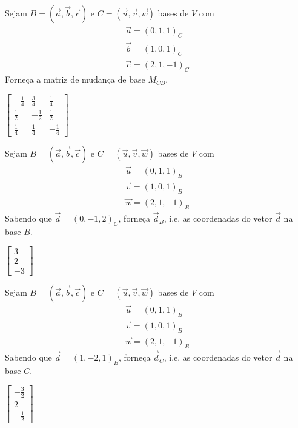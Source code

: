 \begin{exer}
  Sejam $B=(\vec{a},\vec{b},\vec{c})$ e $C=(\vec{u},\vec{v},\vec{w})$ bases de $V$ com
  \begin{gather}
    \vec{a} = (0,1,1)_C\\
    \vec{b} = (1,0,1)_C\\
    \vec{c} = (2,1,-1)_C
  \end{gather}
  Forneça a matriz de mudança de base $M_{CB}$.
\end{exer}
\begin{resp}
  $\displaystyle
  \begin{bmatrix}
    - \frac{1}{4} & \frac{3}{4} & \frac{1}{4}\\
    \frac{1}{2} & - \frac{1}{2} & \frac{1}{2}\\
    \frac{1}{4} & \frac{1}{4} & - \frac{1}{4}
  \end{bmatrix}
$
\end{resp}

\begin{exer}
  Sejam $B=(\vec{a},\vec{b},\vec{c})$ e $C=(\vec{u},\vec{v},\vec{w})$ bases de $V$ com
  \begin{gather}
    \vec{u} = (0,1,1)_B\\
    \vec{v} = (1,0,1)_B\\
    \vec{w} = (2,1,-1)_B
  \end{gather}
  Sabendo que $\vec{d}=(0,-1,2)_{C}$, forneça $\vec{d}_B$, i.e. as coordenadas do vetor $\vec{d}$ na base $B$.
\end{exer}
\begin{resp}
  $\displaystyle\left[\begin{matrix}3\\2\\-3\end{matrix}\right]$
\end{resp}

\begin{exer}
  Sejam $B=(\vec{a},\vec{b},\vec{c})$ e $C=(\vec{u},\vec{v},\vec{w})$ bases de $V$ com
  \begin{gather}
    \vec{u} = (0,1,1)_B\\
    \vec{v} = (1,0,1)_B\\
    \vec{w} = (2,1,-1)_B
  \end{gather}
  Sabendo que $\vec{d}=(1,-2,1)_{B}$, forneça $\vec{d}_C$, i.e. as coordenadas do vetor $\vec{d}$ na base $C$.
\end{exer}
\begin{resp}
  $\displaystyle\left[\begin{matrix}- \frac{3}{2}\\2\\- \frac{1}{2}\end{matrix}\right]$
\end{resp}

